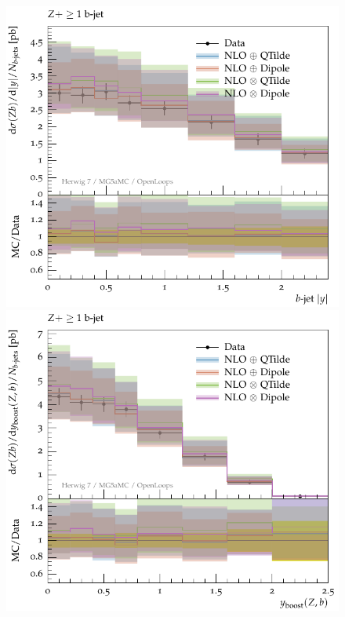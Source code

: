\documentclass[11pt]{cernrep}
\begin{document}
\begin{figure}[htbp]
\begin{center}
   \includegraphics[scale=0.65]{figs/zbb/herwigzbb/atlas-d05-x01-y01.pdf}
   \includegraphics[scale=0.65]{figs/zbb/herwigzbb/atlas-d07-x01-y01.pdf} \\

\end{center}
\end{figure}
\end{document}

